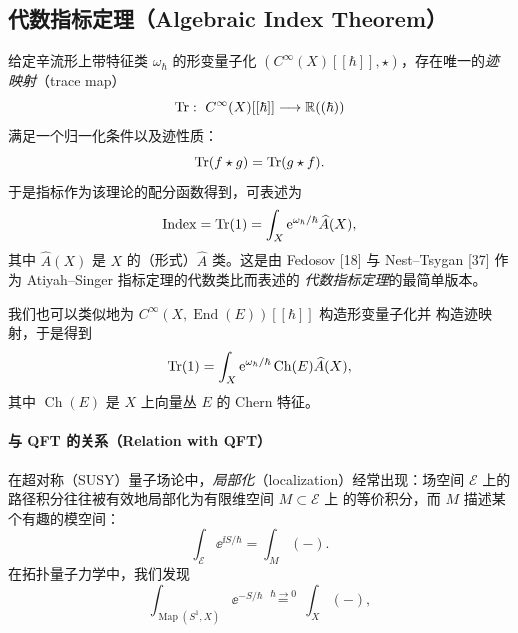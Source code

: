 \subsection{代数指标定理（Algebraic Index Theorem）}

给定辛流形上带特征类 $\omega_{\hbar}$ 的形变量子化
$(C^{\infty}(X)[[\hbar]],\star)$，存在唯一的\emph{迹映射}（trace map）
\[
  \Tr:\ C^{\infty}(X)[[\hbar]]\longrightarrow\R((\hbar))
\]
满足一个归一化条件以及迹性质：
\[
  \operatorname{Tr}(f\star g)=\operatorname{Tr}(g\star f).
\]
于是指标作为该理论的配分函数得到，可表述为
\[
  \operatorname{Index}=\operatorname{Tr}(1)=\int_{X}\mathrm{e}^{\omega_{\hbar}/\hbar}\widehat{A}(X),
\]
其中 $\widehat{A}(X)$ 是 $X$ 的（形式）$\widehat{A}$ 类。这是由 Fedosov \textup{[18]}
与 Nest--Tsygan \textup{[37]} 作为 Atiyah--Singer 指标定理的代数类比而表述的
\emph{代数指标定理}的最简单版本。


我们也可以类似地为 $C^{\infty}(X,\operatorname{End}(E))[[\hbar]]$ 构造形变量子化并
构造迹映射，于是得到
\[
  \operatorname{Tr}(1)=\int_{X}\mathrm{e}^{\omega_{\hbar}/\hbar}\operatorname{Ch}(E)\widehat{A}(X),
\]
其中 $\operatorname{Ch}(E)$ 是 $X$ 上向量丛 $E$ 的 Chern 特征。

\paragraph{与 QFT 的关系（Relation with QFT）}

在超对称（SUSY）量子场论中，\emph{局部化}（localization）经常出现：场空间
$\mathcal{E}$ 上的路径积分往往被有效地局部化为有限维空间 $M\subset\mathcal{E}$ 上
的等价积分，而 $M$ 描述某个有趣的模空间：
\[
  \int_{\mathcal{E}}\ee^{\ii S/\hbar}=\int_{M}(-).
\]
在拓扑量子力学中，我们发现
\[
  \int_{\operatorname{Map}(S^{1},X)}\ee^{-S/\hbar}
  \ \overset{\hbar\to0}{=}\
  \int_{X}(-),
\]


